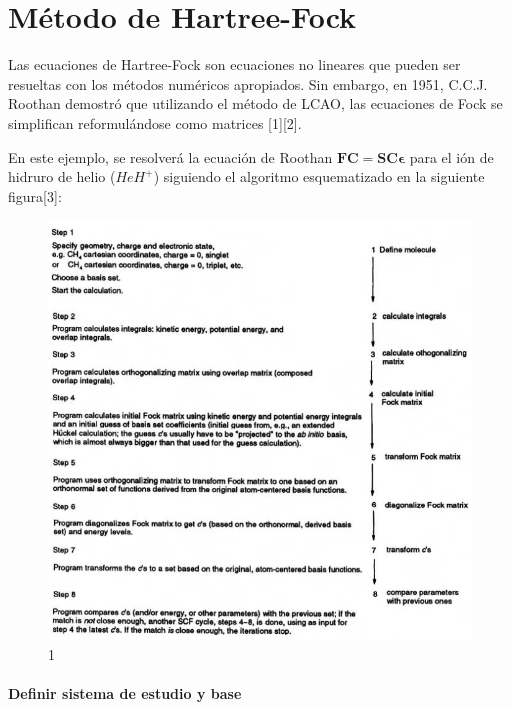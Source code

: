 \documentclass[
  letterpaper,
  DIV=11,
  numbers=noendperiod]{scrreprt}
\begin{document}
\part{Método de Hartree-Fock}

Las ecuaciones de Hartree-Fock son ecuaciones no lineares que pueden ser
resueltas con los métodos numéricos apropiados. Sin embargo, en 1951,
C.C.J. Roothan demostró que utilizando el método de LCAO, las ecuaciones
de Fock se simplifican reformulándose como matrices {[}1{]}{[}2{]}.

En este ejemplo, se resolverá la ecuación de Roothan
\(\textbf{F}\textbf{C}=\textbf{S}\textbf{C}\pmb{\epsilon}\) para el ión
de hidruro de helio (\(HeH^{+}\)) siguiendo el algoritmo esquematizado
en la siguiente figura{[}3{]}:

\begin{figure}

{\centering \includegraphics{./images/im22.png}

}

\caption{1}

\end{figure}

\hypertarget{definir-sistema-de-estudio-y-base}{%
\subsection*{Definir sistema de estudio y
base}\label{definir-sistema-de-estudio-y-base}}
\end{document}
